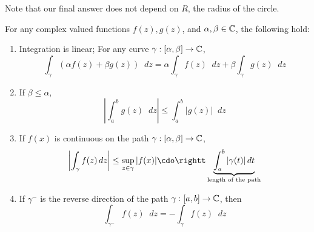 \documentclass[11pt]{article}
\newcommand*\dif{\mathop{}\!d}
\begin{document}
Note that our final answer does not depend on $R$, the radius of the circle.
\begin{theorem}\label{theorem10}
	For any complex valued functions $f(z), g(z)$, and $\alpha, \beta \in \mathbb{C}$, the
	following hold:
	\begin{enumerate}
		\item Integration is linear; For any curve $\gamma:[\alpha,\beta] \to \mathbb{C}$,
			\begin{equation*} \int_{\gamma} (\alpha f(z) + \beta g(z))\dif z =
				\alpha\int_\gamma f(z)\dif z + \beta\int_\gamma g(z)\dif z
			\end{equation*}
		\item If $\beta \leq \alpha$,
			\begin{equation*}
				\left| \int_a^b g(z)\dif z\right| \leq \int_a^b |g(z)| \dif z
			\end{equation*}
		\item If $f(x)$ is continuous on the path $\gamma:[\alpha,\beta] \to \mathbb{C}$,
			\begin{equation*}
				\left| \int_\gamma f(z)\dif z\right| \leq \sup_{z \in \gamma}
				|f(x)| \cdo\rightt
				\underbrace{\int_a^b |\gamma(t)| \dif t}_{\text{length of the path}}
			\end{equation*}
		\item If $\gamma^-$ is the reverse direction of the path $\gamma:[a,b]\to\mathbb{C}$,
			then
			\begin{equation*}
				\int_{\gamma^-} f(z)\dif z = -\int_\gamma f(z)\dif z
			\end{equation*}
	\end{enumerate}
\end{theorem}
\end{document}
